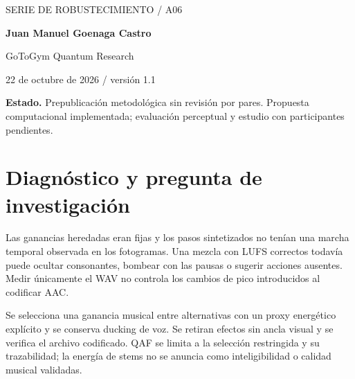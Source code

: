 \documentclass[10pt,a4paper]{article}
\begin{document}
\begin{center}{\sffamily\small\textcolor{mint}{SERIE DE ROBUSTECIMIENTO / A06}}\par\vspace{10pt}{\sffamily\LARGE\bfseries\textcolor{ink}{Mezcla adaptativa y control después del códec}}\par\vspace{7pt}{\large Balance de diálogo, ducking y sonoridad verificable}\par\vspace{12pt}\textbf{Juan Manuel Goenaga Castro}\par GoToGym Quantum Research\par 22 de octubre de 2026 / versión 1.1\end{center}\colorbox{ink!6}{\parbox{.96\linewidth}{\small\textbf{Estado.} Prepublicación metodológica sin revisión por pares. Propuesta computacional implementada; evaluación perceptual y estudio con participantes pendientes.}}\begin{abstract}Se selecciona una ganancia musical entre alternativas con un proxy energético explícito y se conserva ducking de voz. Se retiran efectos sin ancla visual y se verifica el archivo codificado. QAF se limita a la selección restringida y su trazabilidad; la energía de stems no se anuncia como inteligibilidad o calidad musical validadas. Se presenta el problema observado, una formalización con unidades y restricciones, el código correspondiente y sus controles. Se distingue la verificación de ingeniería de calidad percibida, identidad regional y efecto comercial. El uso QAF corresponde a la región clásica identificable y conserva un comparador con los mismos recursos.\end{abstract}
\section{Diagnóstico y pregunta de investigación}
Las ganancias heredadas eran fijas y los pasos sintetizados no tenían una marcha temporal observada en los fotogramas. Una mezcla con LUFS correctos todavía puede ocultar consonantes, bombear con las pausas o sugerir acciones ausentes. Medir únicamente el WAV no controla los cambios de pico introducidos al codificar AAC.

Se selecciona una ganancia musical entre alternativas con un proxy energético explícito y se conserva ducking de voz. Se retiran efectos sin ancla visual y se verifica el archivo codificado. QAF se limita a la selección restringida y su trazabilidad; la energía de stems no se anuncia como inteligibilidad o calidad musical validadas.
\end{document}
